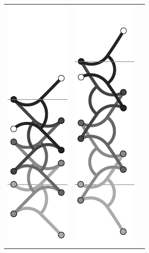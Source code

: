 \documentclass[letterpaper,10pt,conference]{ieeeconf}  %
\begin{document}
\begin{figure}
\begin{center}
\begin{tabular}{ccc}
\includegraphics[scale=1]{../Pics/py/straight_f_ori_1.pdf}&
\includegraphics[scale=1]{../Pics/py/straight_f_ori_01.pdf}&

\end{tabular}
\end{center}
\end{figure}
\end{document}
